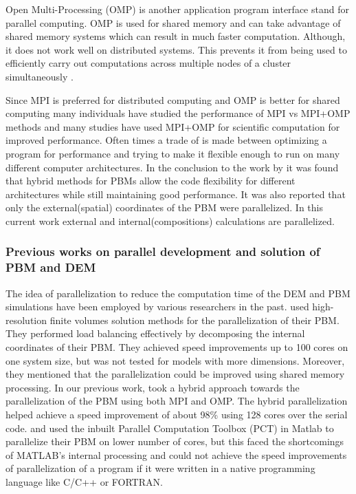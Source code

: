 \documentclass[preprint,11pt,authoryear]{elsarticle}
\begin{document}
Open Multi-Processing (OMP) is another application program interface stand for parallel 
computing. OMP is used for shared memory and can take advantage of shared memory systems which 
can result in much faster computation. Although, it does not work well on distributed systems. This 
prevents it from being used to efficiently carry out computations across multiple nodes of a cluster 
simultaneously \citep{Jin2011}. 

Since MPI is preferred for distributed computing and OMP is better for shared computing many 
individuals have studied the performance of MPI vs MPI+OMP methods and many studies have used 
MPI+OMP for scientific computation for improved performance. Often times a trade of is made 
between optimizing a program for performance and trying to make it flexible enough to run on many 
different computer architectures. In the conclusion to the work by \cite{Bettencourt2017} it was found 
that hybrid methods for PBMs allow the code flexibility for different architectures while still maintaining 
good performance.  It was also reported that only the external(spatial) coordinates of the PBM were 
parallelized. In this current work external and internal(compositions) calculations are parallelized. 

\subsubsection{Previous works on parallel development and solution of PBM and DEM}
The idea of parallelization to reduce the computation time of the DEM and PBM simulations have 
been employed by various researchers in the past. \cite{Gunawan2008} used high-resolution 
finite volumes solution methods for the parallelization of their PBM. They performed load 
balancing effectively by decomposing the internal coordinates of their PBM. They achieved 
speed improvements up to 100 cores on one system size, but was not tested for models 
with more dimensions. Moreover, they mentioned that the parallelization could be 
improved using shared memory processing. In our previous work, \cite{Bettencourt2017} took a 
hybrid approach towards the parallelization of the PBM using both MPI and OMP. 
The hybrid parallelization helped achieve a speed improvement of about 98\% using 
128 cores over the serial code. 
\cite{Prakash2013a} and \cite{Prakash2013b} used the inbuilt Parallel Computation 
Toolbox (PCT) in Matlab \citep{pctMatlab} to parallelize their PBM on lower number 
of cores, but this faced the shortcomings of MATLAB's internal processing and 
could not achieve the speed improvements of parallelization of a program if 
it were written in a native programming language like C/C++ or FORTRAN. 
\end{document}
